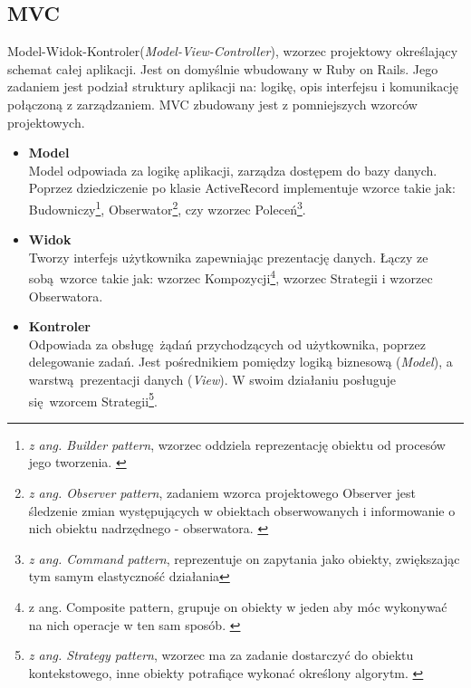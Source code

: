   \subsection{MVC}
   Model-Widok-Kontroler(\emph{Model-View-Controller}), wzorzec projektowy określający schemat całej aplikacji. Jest on domyślnie wbudowany w Ruby on Rails. Jego zadaniem jest podział struktury aplikacji na: logikę, opis interfejsu i komunikację połączoną z zarządzaniem.
   MVC zbudowany jest z pomniejszych wzorców projektowych.
    \begin{itemize}
      \item \textbf {Model} \\
      Model odpowiada za logikę aplikacji, zarządza dostępem do bazy danych.
      Poprzez dziedziczenie po klasie ActiveRecord implementuje wzorce takie jak: Budowniczy\footnote{\emph{z ang. Builder pattern}, wzorzec oddziela reprezentację obiektu od procesów jego tworzenia. \cite{ruby_patterns}}, Obserwator\footnote{\emph{z ang. Observer pattern}, zadaniem wzorca projektowego Observer jest śledzenie zmian występujących w obiektach obserwowanych i informowanie o nich obiektu nadrzędnego - obserwatora. \cite{ruby_patterns}}, czy wzorzec Poleceń\footnote{\emph{z ang. Command pattern}, reprezentuje on zapytania jako obiekty, zwiększając tym samym elastyczność działania\cite{ruby_patterns}}.

      \item \textbf {Widok} \\
      Tworzy interfejs użytkownika zapewniając prezentację danych. Łączy ze sobą wzorce takie jak: wzorzec Kompozycji\footnote{z ang. Composite pattern, grupuje on obiekty w jeden aby móc wykonywać na nich operacje w ten sam sposób. \cite{ruby_patterns}}, wzorzec Strategii i wzorzec Obserwatora.

      \item \textbf {Kontroler} \\
      Odpowiada za obsługę żądań przychodzących od użytkownika, poprzez delegowanie zadań. Jest pośrednikiem pomiędzy logiką biznesową (\emph{Model}), a warstwą prezentacji danych (\emph{View}). W swoim działaniu posługuje się wzorcem Strategii\footnote{ \emph{z ang. Strategy pattern}, wzorzec ma za zadanie dostarczyć do obiektu kontekstowego, inne obiekty potrafiące wykonać określony algorytm. \cite{ruby_patterns}}.
    \end{itemize}

